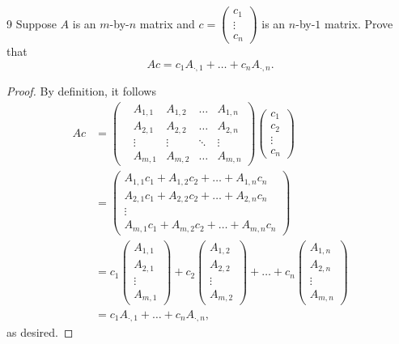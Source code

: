 \documentclass[11pt]{extarticle}
\newenvironment{problem}[1]{\begin{prob*}{#1}{}}{\end{prob*}}
\begin{document}
\begin{problem}{9}
Suppose $A$ is an $m$-by-$n$ matrix and $c = \begin{pmatrix}c_1\\ \vdots \\ c_n\end{pmatrix}$ is an $n$-by-$1$ matrix.  Prove that
\begin{equation*}
Ac = c_1A_{\cdot, 1} + \dots + c_nA_{\cdot, n}.
\end{equation*}
\end{problem}
\begin{proof}
By definition, it follows
\begin{align*}
Ac &= \begin{pmatrix}
		&A_{1,1} &A_{1,2}    &\dots    &A_{1, n} \\ 
		&A_{2,1} &A_{2,2}    &\dots    &A_{2, n} \\
		&\vdots   &\vdots      & \ddots &\vdots \\ 
		&A_{m,1} &A_{m, 2} &\dots    &A_{m,n}\end{pmatrix}
		\begin{pmatrix}c_1\\ c_2\\ \vdots \\ c_n\end{pmatrix}\\
   &= \begin{pmatrix} A_{1,1}c_1 + A_{1,2}c_2 + \dots + A_{1, n}c_n \\ 
   				A_{2,1}c_1 + A_{2,2}c_2 + \dots + A_{2, n}c_n \\
				  \vdots \\ 
				A_{m,1}c_1 + A_{m,2}c_2 + \dots + A_{m, n}c_n \end{pmatrix}\\
   &= c_1\begin{pmatrix} A_{1,1}\\ A_{2,1}\\ \vdots \\ A_{m,1}\end{pmatrix} + c_2\begin{pmatrix} A_{1,2}\\ A_{2,2}\\ \vdots \\ A_{m,2}\end{pmatrix} + \dots + c_n\begin{pmatrix} A_{1,n}\\ A_{2,n}\\ \vdots \\ A_{m,n}\end{pmatrix}\\
   &= c_1A_{\cdot, 1} + \dots + c_nA_{\cdot, n},
\end{align*}
as desired.
\end{proof}
\end{document}

